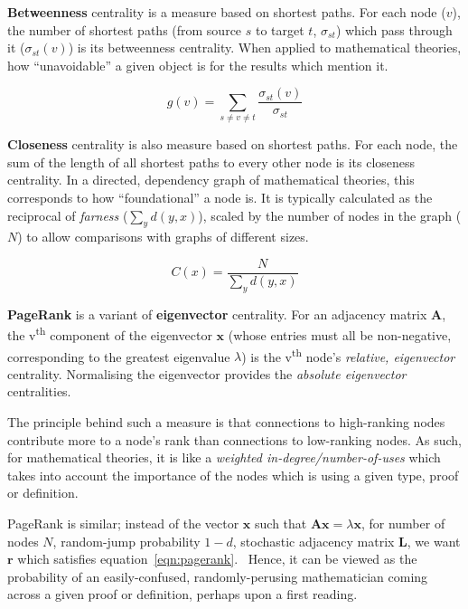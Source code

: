 \textbf{Betweenness} centrality is a measure based on shortest paths. For each
node ($v$), the number of shortest paths (from source $s$ to target $t$,
$\sigma_{st}$) which pass through it ($\sigma_{st}\left(v\right)$) is its
betweenness centrality. When applied to mathematical theories, how
``unavoidable'' a given object is for the results which mention
it.~\cite{freeman1977}

\begin{equation}
  g\left(v\right) = \sum_{s \neq v \neq t} \frac{\sigma_{st}\left(v\right)}{\sigma_{st}}
\end{equation}

\textbf{Closeness} centrality is also measure based on shortest paths. For each
node, the sum of the length of all shortest paths to every other node is its
closeness centrality. In a directed, dependency graph of mathematical theories,
this corresponds to how ``foundational'' a node is. It is typically calculated
as the reciprocal of \emph{farness} ($\sum_{y}d\left(y,x\right)$), scaled by
the number of nodes in the graph ($N$) to allow comparisons with graphs of
different sizes.~\cite{bavelas1950}

\begin{equation}
  C\left(x\right) = \frac{N}{\sum_{y}d\left(y,x\right)}
\end{equation}

\textbf{PageRank} is a variant of \textbf{eigenvector} centrality.  For an
adjacency matrix $\mathbf{A}$, the v\textsuperscript{th} component of the
eigenvector $\mathbf{x}$ (whose entries must all be non-negative, corresponding
to the greatest eigenvalue $\lambda$) is the v\textsuperscript{th} node's
\emph{relative, eigenvector} centrality. Normalising the eigenvector provides
the \emph{absolute eigenvector} centralities.~\cite{newman2008}

The principle behind such a measure is that connections to high-ranking nodes
contribute more to a node's rank than connections to low-ranking nodes.  As
such, for mathematical theories, it is like a \emph{weighted
in-degree/number-of-uses} which takes into account the importance of the nodes
which is using a given type, proof or definition.

PageRank is similar; instead of the vector $\mathbf{x}$ such that $\mathbf{Ax}
= \lambda\mathbf{x}$, for number of nodes $N$, random-jump probability $1-d$,
stochastic adjacency matrix $\mathbf{L}$, we want $\mathbf{r}$ which satisfies
equation~\ref{eqn:pagerank}.~\cite{page1999} Hence, it can be viewed as the
probability of an easily-confused, randomly-perusing mathematician coming
across a given proof or definition, perhaps upon a first reading.

